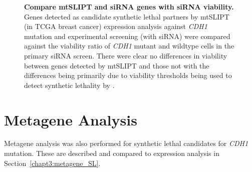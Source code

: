 \begin{figure}[!htp]
\begin{center}
   \end{center}
   \caption[Compare mtSLIPT and siRNA genes with siRNA viability]{\small \textbf{Compare mtSLIPT and siRNA genes with siRNA viability.}  Genes detected as candidate synthetic lethal partners by mtSLIPT (in TCGA breast cancer) expression analysis against \textit{CDH1} mutation and experimental screening (with siRNA) were compared against the viability ratio of \textit{CDH1} mutant and wildtype cells in the primary siRNA screen. There were clear no differences in viability between genes detected by mtSLIPT and those not with the differences being primarily due to viability thresholds being used to detect synthetic lethality by \citet{Telford2015}. 
}
\label{fig:compare_viability_mtSL}
\end{figure}


\clearpage
\section{Metagene Analysis} \label{appendix:metagene_mtSL}

Metagene analysis was also performed for synthetic lethal candidates for \textit{CDH1} mutation. These are described and compared to expression analysis in Section~\ref{chapt3:metagene_SL}. 

